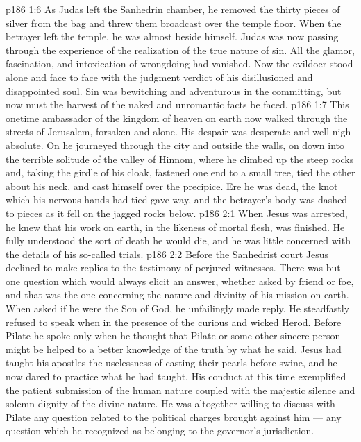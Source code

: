 \vs p186 1:6 As Judas left the Sanhedrin chamber, he removed the thirty pieces of silver from the bag and threw them broadcast over the temple floor. When the betrayer left the temple, he was almost beside himself. Judas was now passing through the experience of the realization of the true nature of sin. All the glamor, fascination, and intoxication of wrongdoing had vanished. Now the evildoer stood alone and face to face with the judgment verdict of his disillusioned and disappointed soul. Sin was bewitching and adventurous in the committing, but now must the harvest of the naked and unromantic facts be faced.
\vs p186 1:7 This onetime ambassador of the kingdom of heaven on earth now walked through the streets of Jerusalem, forsaken and alone. His despair was desperate and well\hyp{}nigh absolute. On he journeyed through the city and outside the walls, on down into the terrible solitude of the valley of Hinnom, where he climbed up the steep rocks and, taking the girdle of his cloak, fastened one end to a small tree, tied the other about his neck, and cast himself over the precipice. Ere he was dead, the knot which his nervous hands had tied gave way, and the betrayer’s body was dashed to pieces as it fell on the jagged rocks below.
\vs p186 2:1 When Jesus was arrested, he knew that his work on earth, in the likeness of mortal flesh, was finished. He fully understood the sort of death he would die, and he was little concerned with the details of his so\hyp{}called trials.
\vs p186 2:2 Before the Sanhedrist court Jesus declined to make replies to the testimony of perjured witnesses. There was but one question which would always elicit an answer, whether asked by friend or foe, and that was the one concerning the nature and divinity of his mission on earth. When asked if he were the Son of God, he unfailingly made reply. He steadfastly refused to speak when in the presence of the curious and wicked Herod. Before Pilate he spoke only when he thought that Pilate or some other sincere person might be helped to a better knowledge of the truth by what he said. Jesus had taught his apostles the uselessness of casting their pearls before swine, and he now dared to practice what he had taught. His conduct at this time exemplified the patient submission of the human nature coupled with the majestic silence and solemn dignity of the divine nature. He was altogether willing to discuss with Pilate any question related to the political charges brought against him --- any question which he recognized as belonging to the governor’s jurisdiction.
